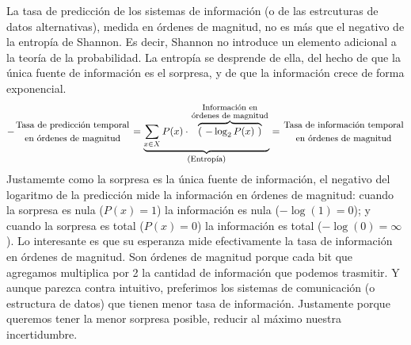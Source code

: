 \documentclass[a4paper,11pt]{book}
\newcommand\hfrac[2]{\genfrac{}{}{0pt}{}{#1}{#2}} %
\theoremstyle{definition}
\begin{document}

La tasa de predicción de los sistemas de información (o de las estrcuturas de datos alternativas), medida en órdenes de magnitud, no es más que el negativo de la entropía de Shannon.
%
Es decir, Shannon no introduce un elemento adicional a la teoría de la probabilidad.
%
La entropía se desprende de ella, del hecho de que la única fuente de información es el sorpresa, y de que la información crece de forma exponencial.
%
\begin{equation*}
- \hfrac{\text{\small Tasa de predicción temporal}}{\text{\small en órdenes de magnitud}} = \underbrace{\sum_{x\in X} P(x) \cdot \overbrace{(\ - \log_2 P(x) \ )}^{\hfrac{\text{\footnotesize \phantom{p}Información en\phantom{p}}}{\text{\footnotesize órdenes de magnitud}}}}_{\text{\footnotesize (Entropía)}} = \hfrac{\text{\small Tasa de información temporal}}{\text{\small en órdenes de magnitud}}
\end{equation*}
%
Justamemte como la sorpresa es la única fuente de información, el negativo del logaritmo de la predicción mide la información en órdenes de magnitud: cuando la sorpresa es nula ($P(x)=1$) la información es nula ($-\log(1) = 0$); y cuando la sorpresa es total ($P(x)=0$) la información es total ($-\log(0) = \infty$).
%
Lo interesante es que su esperanza mide efectivamente la tasa de información en órdenes de magnitud.
%
Son órdenes de magnitud porque cada bit que agregamos multiplica por 2 la cantidad de información que podemos trasmitir.
%
Y aunque parezca contra intuitivo, preferimos los sistemas de comunicación (o estructura de datos) que tienen menor tasa de información.
%
Justamente porque queremos tener la menor sorpresa posible, reducir al máximo nuestra incertidumbre.

\end{document}
